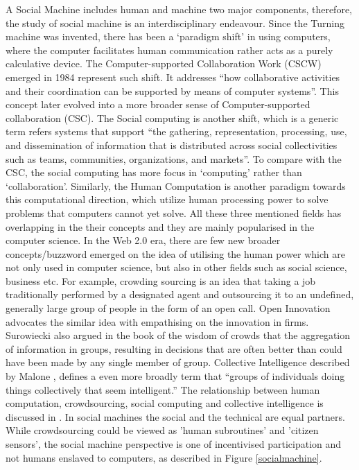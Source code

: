 \documentclass{sig-alternate}
\begin{document}
A Social Machine includes human and machine two major components, therefore, the study of social machine is an interdisciplinary endeavour. Since the Turning machine was invented, there has been a `paradigm shift' \cite{kuhn1996structure} in using computers, where the computer facilitates human communication rather acts as a purely calculative device. The Computer-supported Collaboration Work (CSCW) emerged in 1984 represent such shift. It addresses ``how collaborative activities and their coordination can be supported by means of computer systems''. This concept later evolved into a more broader sense of  Computer-supported collaboration (CSC). The Social computing \cite{parameswaran2007research} is another shift, which is a generic term refers systems that support ``the gathering, representation, processing, use, and dissemination of information that is distributed across social collectivities such as teams, communities, organizations, and markets''. To compare with the CSC, the social computing has more focus in `computing' rather than `collaboration'. Similarly, the Human Computation \cite{von2009human} is another paradigm towards this computational direction, which utilize human processing power to solve problems that computers cannot yet solve. All these three mentioned fields has overlapping in the their concepts and they are mainly popularised in the computer science. In the Web 2.0 era, there are few new broader concepts/buzzword emerged on the idea of utilising the human power which are not only used in computer science, but also in other fields such as social science, business etc. For example, crowding sourcing \cite{howe2006crowdsourcing} is an idea that taking a job traditionally performed by a designated agent and outsourcing it to an undefined, generally large group of people in the form of an open call. Open Innovation \cite{chesbrough2008open} advocates the similar idea with empathising on the innovation in firms. Surowiecki also argued in the book of the wisdom of crowds \cite{surowiecki2005wisdom} that the aggregation of information in groups, resulting in decisions that are often better than could have been made by any single member of group. Collective Intelligence described by Malone \cite{malone2009harnessing}, defines a even more broadly term that ``groups of individuals doing things collectively that seem intelligent.'' 
The relationship between human computation, crowdsourcing, social computing and collective intelligence is discussed in \cite{quinn2011human}. 
In  social machines  the  social and  the  technical are equal  partners. While  crowdsourcing  could  be  viewed  as  'human  subroutines'  and  'citizen  sensors',  the social machine perspective is one of incentivised participation and not humans enslaved to computers, as described in Figure \ref{socialmachine}.
\end{document}
